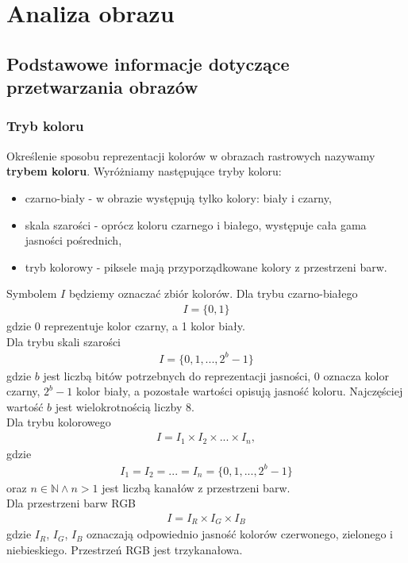 \section{Analiza obrazu}
\subsection{Podstawowe informacje dotyczące przetwarzania obrazów}
\subsubsection{Tryb koloru}
Określenie sposobu reprezentacji kolorów w obrazach rastrowych nazywamy \textbf{trybem koloru}. Wyróżniamy następujące tryby koloru:
\begin{itemize}
  \item czarno-biały - w obrazie występują tylko kolory: biały i czarny,
  \item skala szarości - oprócz koloru czarnego i białego, występuje cała gama jasności pośrednich,
  \item tryb kolorowy - piksele mają przyporządkowane kolory z przestrzeni barw.
\end{itemize}
Symbolem $I$ będziemy oznaczać zbiór kolorów. Dla trybu czarno-białego
\begin{gather*}
  I = \{0, 1\}
\end{gather*} gdzie 0 reprezentuje kolor czarny, a 1 kolor biały.\\
Dla trybu skali szarości
\begin{gather*}
  I = \{0, 1, ..., 2^b-1\}
\end{gather*}
gdzie $b$ jest liczbą bitów potrzebnych do reprezentacji jasności, 0 oznacza kolor czarny, $2^b-1$ kolor biały, a pozostałe wartości opisują jasność koloru. Najczęściej wartość $b$ jest wielokrotnością liczby 8.\\
Dla trybu kolorowego
\begin{gather*}
  I = I_1 \times I_2 \times ... \times I_n,
\end{gather*}
gdzie
\begin{gather*}
  I_1 = I_2 = ... = I_n = \{0, 1, ..., 2^b-1\}
\end{gather*}
oraz $n\in \mathbb{N} \wedge n > 1$ jest liczbą kanałów z przestrzeni barw. \\
Dla przestrzeni barw RGB
\begin{gather*}
  I = I_R \times I_G \times I_B
\end{gather*}
gdzie $I_R$, $I_G$, $I_B$ oznaczają odpowiednio jasność kolorów czerwonego, zielonego i niebieskiego. Przestrzeń RGB jest trzykanałowa.

